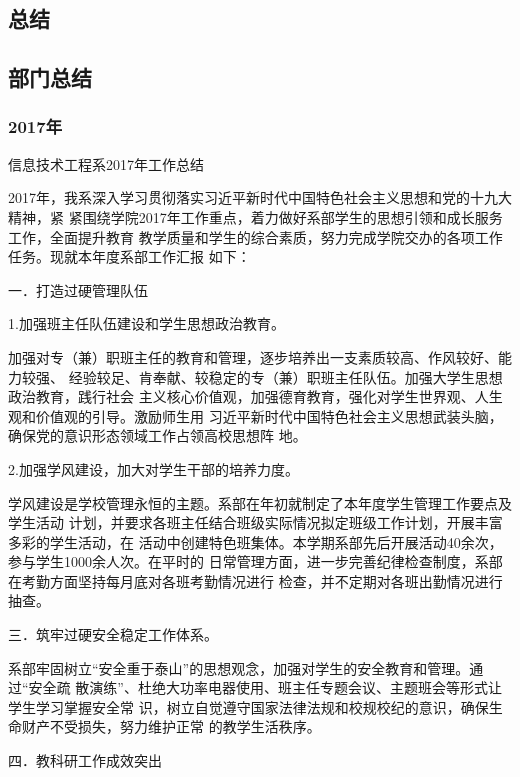 \documentclass[11pt]{ctexart}
\begin{document}
{{{{\subsection{总结}
\label{sec:org94f0d9e}
\subsection{部门总结}
\label{sec:orga18810e}
\subsubsection{2017年}
\label{sec:org30b470b}
信息技术工程系2017年工作总结

2017年，我系深入学习贯彻落实习近平新时代中国特色社会主义思想和党的十九大精神，紧
紧围绕学院2017年工作重点，着力做好系部学生的思想引领和成长服务工作，全面提升教育
教学质量和学生的综合素质，努力完成学院交办的各项工作任务。现就本年度系部工作汇报
如下：

一．打造过硬管理队伍

1.加强班主任队伍建设和学生思想政治教育。

加强对专（兼）职班主任的教育和管理，逐步培养出一支素质较高、作风较好、能力较强、
经验较足、肯奉献、较稳定的专（兼）职班主任队伍。加强大学生思想政治教育，践行社会
主义核心价值观，加强德育教育，强化对学生世界观、人生观和价值观的引导。激励师生用
习近平新时代中国特色社会主义思想武装头脑，确保党的意识形态领域工作占领高校思想阵
地。

2.加强学风建设，加大对学生干部的培养力度。

学风建设是学校管理永恒的主题。系部在年初就制定了本年度学生管理工作要点及学生活动
计划，并要求各班主任结合班级实际情况拟定班级工作计划，开展丰富多彩的学生活动，在
活动中创建特色班集体。本学期系部先后开展活动40余次，参与学生1000余人次。在平时的
日常管理方面，进一步完善纪律检查制度，系部在考勤方面坚持每月底对各班考勤情况进行
检查，并不定期对各班出勤情况进行抽查。

三．筑牢过硬安全稳定工作体系。

系部牢固树立“安全重于泰山”的思想观念，加强对学生的安全教育和管理。通过“安全疏
散演练”、杜绝大功率电器使用、班主任专题会议、主题班会等形式让学生学习掌握安全常
识，树立自觉遵守国家法律法规和校规校纪的意识，确保生命财产不受损失，努力维护正常
的教学生活秩序。

四．教科研工作成效突出

}}}}
\end{document}
